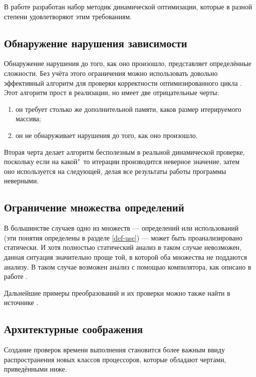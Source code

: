 В работе \cite{ZuckPFGH02} разработан набор методик динамической оптимизации, которые в разной степени удовлетворяют этим требованиям.

\subsection{Обнаружение нарушения зависимости}

Обнаружение нарушения до того, как оно произошло, представляет определённые сложности. Без учёта этого ограничения можно использовать довольно эффективный алгоритм для проверки корректности оптимизированного цикла \cite{ZuckPFGH02}. Этот алгоритм прост в реализации, но имеет две отрицательные черты:

\begin{enumerate}
	\item он требует столько же дополнительной памяти, каков размер итерируемого массива;
	\item он не обнаруживает нарушения до того, как оно произошло.
\end{enumerate}

Вторая черта делает алгоритм бесполезным в реальной динамической проверке, поскольку если на какой"~то итерации производится неверное значение, затем оно используется на следующей, делая все результаты работы программы неверными.

\subsection{Ограничение множества определений}

В большинстве случаев одно из множеств --- определений или использований (эти понятия определены в разделе \ref{def-use}) --- может быть проанализировано статически. И хотя полностью статический анализ в таком случае невозможен, данная ситуация значительно проще той, в которой оба множества не поддаются анализу. В таком случае возможен анализ с помощью компилятора, как описано в работе \cite{ZuckPFGH02}.

Дальнейшие примеры преобразований и их проверки можно также найти в источнике \cite{ZuckPFGH02}.

\subsection{Архитектурные соображения}

Создание проверок времени выполнения становится более важным ввиду распространения новых классов процессоров, которые обладают чертами, приведёнными ниже.

